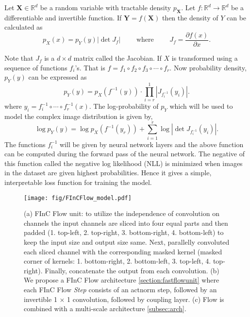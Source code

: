 \documentclass[a4paper,twoside]{article}
\theoremstyle{definition}
\begin{document}
Let $\mathbf{X} \in \mathbb{R}^d$ be a random variable with tractable density $p_\mathbf{X}$. Let $f:\mathbb{R}^d \rightarrow \mathbb{R}^{d}$ be a differentiable and invertible function. If $\mathbf{Y} = f(\mathbf{X})$ then the density of $Y$ can be calculated as 
$$ p_X(x) = p_Y(y) \left| \det J_f  \right| \qquad \text{ where } \qquad J_f =  \frac{\partial f(x)}{\partial x}.$$ 

Note that $J_f$ is a $d \times d$ matrix called the Jacobian. If $X$ is transformed using a sequence of functions $f_i$'s. That is
$f = f_1 \circ f_2 \circ f_3 \circ \cdots \circ f_r$. Now probability density, $p_Y(y)$ can be expressed as 
\begin{equation}
    p_Y(y) = p_X(f^{-1}(y)) \cdot \displaystyle \prod_{i = r}^{1}  |J_{f_i^{-1}}(y_i)| .
\end{equation}
where $ y_i = f_i^{-1}\circ \cdots \circ f_r^{-1}(x)$.
The log-probability of $p_Y$ which will be used to model the complex image distribution is given by,
\begin{equation}
\label{eq:nll}
    \log p_Y(y) = \log p_X(f^{-1}(y_r)) + \displaystyle \sum_{i=1}^{r}  \log |\det 
    J_{f^{-1}_i}(y_i)|.
\end{equation}
The functions $f_i^{-1}$ will be given by neural network layers and the above function can be computed during the forward pass of the neural network. The negative of this function called the negative log likelihood (NLL) is minimized when images in the dataset are given highest probabilities. Hence it gives a simple, interpretable loss function for training the model. 

\begin{figure*}[!ht]
    \centering
    \texttt{[image: fig/FInCFlow\_model.pdf]}
    \caption{(a) FInC Flow unit: to utilize the independence of convolution on channels the input channels are sliced into four equal parts and then padded (1. top-left, 2. top-right, 3. bottom-right, 4. bottom-left) to keep the input size and output size same. Next, parallelly convoluted each sliced channel with the corresponding masked kernel (masked corner of kernels: 1. bottom-right, 2. bottom-left, 3. top-left, 4. top-right). Finally, concatenate the output from each convolution. (b) We propose a FInC Flow architecture  \ref{section:fastflowunit} where each FInC Flow \emph{Step}  consists of an actnorm step, followed by an invertible 1 × 1 convolution, followed by coupling layer. (c) Flow is combined with a multi-scale architecture \ref{subsec:arch}.}
    \label{fastflow}
\end{figure*}
\end{document}
